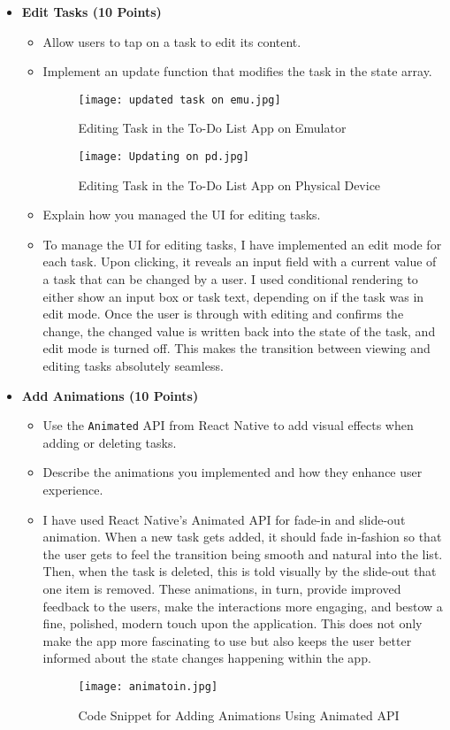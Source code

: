 \documentclass{article}
\begin{document}
\begin{itemize}
    \item \textbf{Edit Tasks (10 Points)}
    \begin{itemize}
        \item Allow users to tap on a task to edit its content.
        \item Implement an update function that modifies the task in the state array.
        \begin{figure}[H]
            \centering
            \texttt{[image: updated task on emu.jpg]}
            \caption{Editing Task in the To-Do List App on Emulator}
        \end{figure}
        \begin{figure}[H]
            \centering
            \texttt{[image: Updating on pd.jpg]}
            \caption{Editing Task in the To-Do List App on Physical Device}
        \end{figure}
        \item Explain how you managed the UI for editing tasks.
        \item To manage the UI for editing tasks, I have implemented an edit mode for each task. Upon clicking, it reveals an input field with a current value of a task that can be changed by a user. I used conditional rendering to either show an input box or task text, depending on if the task was in edit mode. Once the user is through with editing and confirms the change, the changed value is written back into the state of the task, and edit mode is turned off. This makes the transition between viewing and editing tasks absolutely seamless.
    \end{itemize}
    
    \item \textbf{Add Animations (10 Points)}
    \begin{itemize}
        \item Use the \texttt{Animated} API from React Native to add visual effects when adding or deleting tasks.
        \item Describe the animations you implemented and how they enhance user experience.
             \item I have used React Native's Animated API for fade-in and slide-out animation. When a new task gets added, it should fade in-fashion so that the user gets to feel the transition being smooth and natural into the list. Then, when the task is deleted, this is told visually by the slide-out that one item is removed. These animations, in turn, provide improved feedback to the users, make the interactions more engaging, and bestow a fine, polished, modern touch upon the application. This does not only make the app more fascinating to use but also keeps the user better informed about the state changes happening within the app.
        \begin{figure}[H]
            \centering
            \texttt{[image: animatoin.jpg]}
            \caption{Code Snippet for Adding Animations Using Animated API}
        \end{figure}
    \end{itemize}
\end{itemize}
\end{document}
